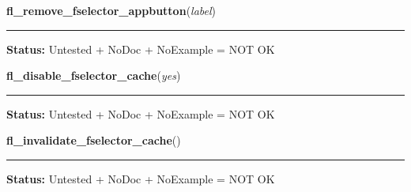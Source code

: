     \label{xformslib:library:fl_remove_fselector_appbutton}

    \vspace{0.5ex}

\hspace{.8\funcindent}\begin{boxedminipage}{\funcwidth}

    \raggedright \textbf{fl\_remove\_fselector\_appbutton}(\textit{label})

    \vspace{-1.5ex}

    \rule{\textwidth}{0.5\fboxrule}
\setlength{\parskip}{2ex}
\setlength{\parskip}{1ex}
\textbf{Status:} Untested + NoDoc + NoExample = NOT OK



    \end{boxedminipage}

    \label{xformslib:library:fl_disable_fselector_cache}

    \vspace{0.5ex}

\hspace{.8\funcindent}\begin{boxedminipage}{\funcwidth}

    \raggedright \textbf{fl\_disable\_fselector\_cache}(\textit{yes})

    \vspace{-1.5ex}

    \rule{\textwidth}{0.5\fboxrule}
\setlength{\parskip}{2ex}
\setlength{\parskip}{1ex}
\textbf{Status:} Untested + NoDoc + NoExample = NOT OK



    \end{boxedminipage}

    \label{xformslib:library:fl_invalidate_fselector_cache}

    \vspace{0.5ex}

\hspace{.8\funcindent}\begin{boxedminipage}{\funcwidth}

    \raggedright \textbf{fl\_invalidate\_fselector\_cache}()

    \vspace{-1.5ex}

    \rule{\textwidth}{0.5\fboxrule}
\setlength{\parskip}{2ex}
\setlength{\parskip}{1ex}
\textbf{Status:} Untested + NoDoc + NoExample = NOT OK



    \end{boxedminipage}

